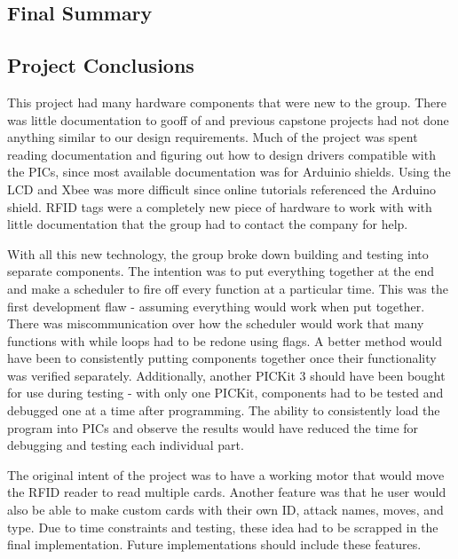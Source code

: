\documentclass[12pt]{article} %
\begin{document}
\begin{itemize}
\begin{itemize}
\begin{itemize}
\begin{itemize}
\subsection{Final Summary}


\subsection{Project Conclusions} %

This project had many hardware components that were new to the group. There was little documentation to gooff of and previous capstone projects had not done anything similar to our design requirements. Much of the project was spent
reading documentation and figuring out how to design drivers compatible with the PICs, since most available documentation was
for Arduinio shields. Using the LCD and Xbee was more difficult since online tutorials referenced the Arduino shield. RFID tags
were a completely new piece of hardware to work with with little documentation that the group had to contact the company for help.

With all this new technology, the group broke down building and testing into separate components. The intention was to put everything
together at the end and make a scheduler to fire off every function at a particular time. This was the first development flaw - assuming
everything would work when put together. There was miscommunication over how the scheduler would work that many functions with while 
loops had to be redone using flags. A better method would have been to consistently putting components together once their functionality
was verified separately. Additionally, another PICKit 3 should have been bought for use during testing - with only one PICKit, components
had to be tested and debugged one at a time after programming. The ability to consistently load the program into PICs and observe the results
would have reduced the time for debugging and testing each individual part.

The original intent of the project was to have a working motor that would move the
RFID reader to read multiple cards. Another feature was that he user would also be able to make custom cards
with their own ID, attack names, moves, and type. Due to time constraints and testing, these idea had
to be scrapped in the final implementation. Future implementations should include these features.


\end{itemize}
\end{itemize}
\end{itemize}
\end{itemize}
\end{document}
